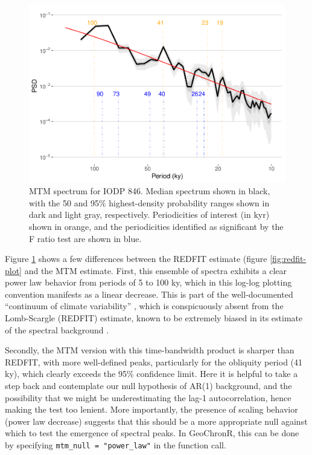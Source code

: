 \documentclass[gchron, manuscript]{copernicus}
\begin{document}
\begin{figure}
\includegraphics[width=12cm]{geoChronR-paper_files/figure-latex/mtm-ensemble-export-1} \caption{MTM spectrum for IODP 846. Median spectrum shown in black, with the 50 and 95\% highest-density probability ranges shown in dark and light gray, respectively. Periodicities of interest (in kyr) shown in orange, and the periodicities identified as significant by the F ratio test are shown in blue.}\label{fig:mtm-ensemble-export}
\end{figure}

Figure \ref{fig:mtm-ensemble-export} shows a few differences between the REDFIT estimate (figure \ref{fig:redfit-plot} and the MTM estimate. First, this ensemble of spectra exhibits a clear power law behavior from periods of 5 to 100 ky, which in this log-log plotting convention manifests as a linear decrease.
This is part of the well-documented ``continuum of climate variability'' \citep{Huybers_Curry2006, ZhuPNAS2019}, which is conspicuously absent from the Lomb-Scargle (REDFIT) estimate, known to be extremely biased in its estimate of the spectral background \citep{schulz2002}.

Secondly, the MTM version with this time-bandwidth product is sharper than REDFIT, with more well-defined peaks, particularly for the obliquity period (41 ky), which clearly exceeds the 95\% confidence limit.
Here it is helpful to take a step back and contemplate our null hypothesis of AR(1) background, and the possibility that we might be underestimating the lag-1 autocorrelation, hence making the test too lenient.
More importantly, the presence of scaling behavior (power law decrease) suggests that this should be a more appropriate null against which to test the emergence of spectral peaks.
In GeoChronR, this can be done by specifying \texttt{mtm\_null\ =\ "power\_law"} in the function call.
\end{document}
